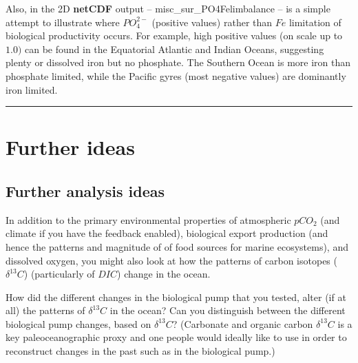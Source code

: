 \vspace{1mm}
Also, in the  2D \textbf{netCDF} output -- \textsf{\footnotesize misc\_sur\_PO4Felimbalance} -- is a simple attempt to illustrate where \(PO^{2-}_{4}\) (positive values) rather than \(Fe\) limitation of biological productivity occurs. For example, high positive values (on scale up to \(1.0)\) can be found in the Equatorial Atlantic and Indian Oceans, suggesting plenty or dissolved iron but no phosphate. The Southern Ocean is more iron than phosphate limited, while the Pacific gyres (most negative values) are dominantly iron limited.

\vspace{1mm} \noindent\rule{4cm}{0.1mm} \vspace{2mm}

\newpage

\section{Further ideas}


\subsection{Further analysis ideas}

\noindent In addition to the primary environmental properties of atmospheric \(pCO_{2}\) (and climate if you have the feedback enabled), biological export production (and hence the patterns and magnitude of of food sources for marine ecosystems), and dissolved oxygen, you might also look at how the patterns of carbon isotopes (\(\delta^{13}C\)) (particularly of \(DIC\)) change in the ocean. 

How did the different changes in the biological pump that you tested, alter (if at all) the patterns of \(\delta^{13}C\) in the ocean? Can you distinguish between the different biological pump changes, based on \(\delta^{13}C\)? (Carbonate and organic carbon \(\delta^{13}C\) is a key paleoceanographic proxy and one people would ideally like to use in order to reconstruct changes in the past such as in the biological pump.)


